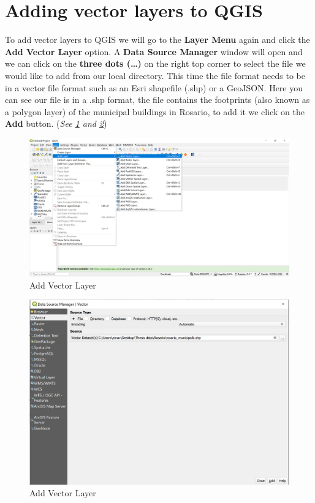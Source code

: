 \documentclass[
]{book}
\begin{document}
\hypertarget{adding-vector-layers-to-qgis}{%
\section{Adding vector layers to QGIS}\label{adding-vector-layers-to-qgis}}

To add vector layers to QGIS we will go to the \textbf{Layer Menu} again and click the \textbf{Add Vector Layer} option. A \textbf{Data Source Manager} window will open and we can click on the \textbf{three dots (\ldots)} on the right top corner to select the file we would like to add from our local directory. This time the file format needs to be in a vector file format such as an Esri shapefile (.shp) or a GeoJSON. Here you can see our file is in a .shp format, the file contains the footprints (also known as a polygon layer) of the municipal buildings in Rosario, to add it we click on the \textbf{Add} button. (\emph{See \ref{fig:img-11} and \ref{fig:img-111}})

\begin{figure}

{\centering \includegraphics[width=1\linewidth]{images/qgis1} 

}

\caption{Add Vector Layer}\label{fig:img-11}
\end{figure}
\begin{figure}

{\centering \includegraphics[width=1\linewidth]{images/vectoradd} 

}

\caption{Add Vector Layer}\label{fig:img-111}
\end{figure}
\end{document}
